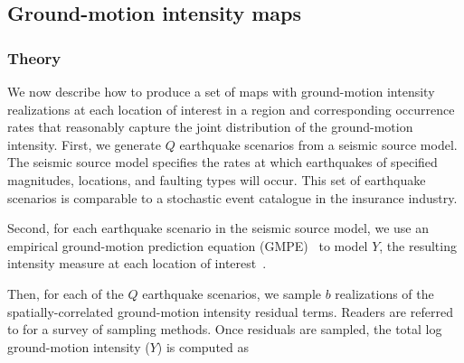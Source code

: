 \subsection{Ground-motion intensity maps}
\subsubsection{Theory}
We now describe how to produce a set of maps with ground-motion intensity realizations at each location of interest in a region and corresponding occurrence rates that reasonably capture the joint distribution of the ground-motion intensity. First, we generate $Q$ earthquake scenarios from a seismic source model. The seismic source model specifies the rates at which earthquakes of specified magnitudes, locations, and faulting types will occur. This set of earthquake scenarios is comparable to a stochastic event catalogue in the insurance industry.

Second, for each earthquake scenario in the seismic source model, we use an empirical ground-motion prediction equation (GMPE)~\cite[e.g.,][]{boore_ground-motion_2008,abrahamson_summary_2008,chiou_nga_2008,campbell_nga_2008} to model $Y$, the resulting intensity measure at each location of interest~\cite[e.g.,][]{baker_which_2006,foulser-piggott_predictive_2012}. %

Then, for each of the $Q$ earthquake scenarios, we sample $b$ realizations of the spatially-correlated ground-motion intensity residual terms. Readers are referred to \cite{han_probabilistic_2012} for a survey of sampling methods.  Once residuals are sampled, the total log ground-motion intensity ($Y$) is computed as 


